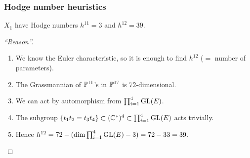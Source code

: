 \begin{frame}
\frametitle{Hodge number heuristics}
\begin{conjecture}
$X_1$ have Hodge numbers $h^{11}=3$ and $h^{12}=39$.
\end{conjecture}
\begin{proof}[``Reason'']

\begin{enumerate}[<+->]
	\item We know the Euler characteristic, so it is enough to find $h^{12}$ ($=$ number of parameters).
	\item The Grassmannian of $\P^{11}$'s in $\P^{17}$ is $72$-dimensional.
	\item We can act by automorphism from $\prod_{i=1}^4 \GL(E)$.
	\item The subgroup $\{ t_1t_2=t_3t_4 \} \subset (\C^\ast)^4 \subset \prod_{i=1}^4 \GL(E)$ acts trivially.
	\item Hence $h^{12}=72-(\dim \prod_{i=1}^4 \GL(E) - 3) = 72-33=39$.\qedhere
\end{enumerate}

\end{proof}


\end{frame}